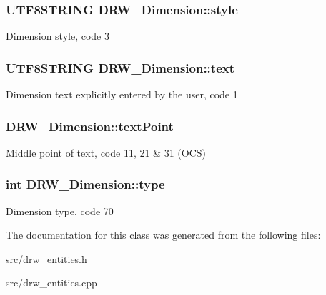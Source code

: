 \subsubsection[{style}]{\setlength{\rightskip}{0pt plus 5cm}U\+T\+F8\+S\+T\+R\+I\+N\+G D\+R\+W\+\_\+\+Dimension\+::style\hspace{0.3cm}{\ttfamily [private]}}\label{class_d_r_w___dimension_af781a0d7108a2caf9642b4a7cc79b1fb}
Dimension style, code 3 \hypertarget{class_d_r_w___dimension_a0e7e8ed05c8bf34019ce2594075611cd}{}
\subsubsection[{text}]{\setlength{\rightskip}{0pt plus 5cm}U\+T\+F8\+S\+T\+R\+I\+N\+G D\+R\+W\+\_\+\+Dimension\+::text\hspace{0.3cm}{\ttfamily [private]}}\label{class_d_r_w___dimension_a0e7e8ed05c8bf34019ce2594075611cd}
Dimension text explicitly entered by the user, code 1 \hypertarget{class_d_r_w___dimension_a166186e4b2b8e23b476e2c1b69878c49}{}
\subsubsection[{text\+Point}]{ D\+R\+W\+\_\+\+Dimension\+::text\+Point\hspace{0.3cm}{\ttfamily [private]}}\label{class_d_r_w___dimension_a166186e4b2b8e23b476e2c1b69878c49}
Middle point of text, code 11, 21 \& 31 (O\+C\+S) \hypertarget{class_d_r_w___dimension_ad3af7cb327656cb2c1c33a00d26ed933}{}
\subsubsection[{type}]{\setlength{\rightskip}{0pt plus 5cm}int D\+R\+W\+\_\+\+Dimension\+::type}\label{class_d_r_w___dimension_ad3af7cb327656cb2c1c33a00d26ed933}
Dimension type, code 70 

The documentation for this class was generated from the following files\+:\begin{DoxyCompactItemize}
\item 
src/drw\+\_\+entities.\+h\item 
src/drw\+\_\+entities.\+cpp\end{DoxyCompactItemize}
